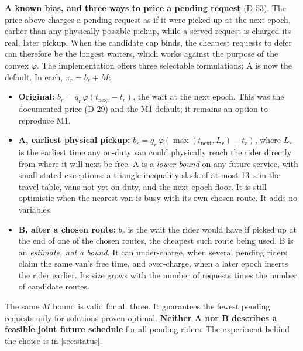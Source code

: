 \documentclass[11pt,letterpaper]{article}
\newcommand{\D}[1]{D-#1}
\begin{document}
\textbf{A known bias, and three ways to price a pending request} (\D{53}). The price above charges a pending request as if it were picked up at the next epoch, earlier than any physically possible pickup, while a served request is charged its real, later pickup. When the candidate cap binds, the cheapest requests to defer can therefore be the longest waiters, which works against the purpose of the convex $\varphi$. The implementation offers three selectable formulations; A is now the default. In each, $\pi_r = b_r + M$:
\begin{itemize}
\item \textbf{Original:} $b_r = q_r\,\varphi(t_{\text{next}} - t_r)$, the wait at the next epoch. This was the documented price (\D{29}) and the M1 default; it remains an option to reproduce M1.
\item \textbf{A, earliest physical pickup:} $b_r = q_r\,\varphi(\max(t_{\text{next}}, L_r) - t_r)$, where $L_r$ is the earliest time any on-duty van could physically reach the rider directly from where it will next be free. A is a \emph{lower bound} on any future service, with small stated exceptions: a triangle-inequality slack of at most 13~s in the travel table, vans not yet on duty, and the next-epoch floor. It is still optimistic when the nearest van is busy with its own chosen route. It adds no variables.
\item \textbf{B, after a chosen route:} $b_r$ is the wait the rider would have if picked up at the end of one of the chosen routes, the cheapest such route being used. B is an \emph{estimate, not a bound}. It can under-charge, when several pending riders claim the same van's free time, and over-charge, when a later epoch inserts the rider earlier. Its size grows with the number of requests times the number of candidate routes.
\end{itemize}
The same $M$ bound is valid for all three. It guarantees the fewest pending requests only for solutions proven optimal. \textbf{Neither A nor B describes a feasible joint future schedule} for all pending riders. The experiment behind the choice is in \cref{sec:status}.
\end{document}
